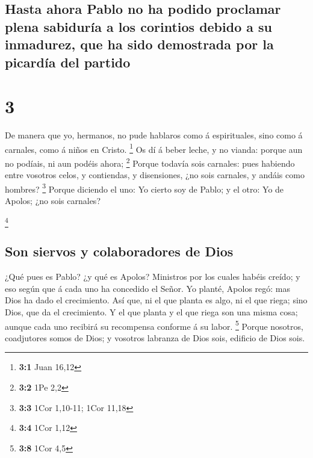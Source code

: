 \hypertarget{hasta-ahora-pablo-no-ha-podido-proclamar-plena-sabiduruxeda-a-los-corintios-debido-a-su-inmadurez-que-ha-sido-demostrada-por-la-picarduxeda-del-partido}{%
\subsection{Hasta ahora Pablo no ha podido proclamar plena sabiduría a
los corintios debido a su inmadurez, que ha sido demostrada por la
picardía del
partido}\label{hasta-ahora-pablo-no-ha-podido-proclamar-plena-sabiduruxeda-a-los-corintios-debido-a-su-inmadurez-que-ha-sido-demostrada-por-la-picarduxeda-del-partido}}

\hypertarget{section-2}{%
\section{3}\label{section-2}}

 De manera que yo, hermanos, no pude hablaros como á
espirituales, sino como á carnales, como á niños en Cristo. \footnote{\textbf{3:1}
  Juan 16,12}  Os dí á beber leche, y no vianda: porque aun
no podíais, ni aun podéis ahora; \footnote{\textbf{3:2} 1Pe 2,2}
 Porque todavía sois carnales: pues habiendo entre vosotros
celos, y contiendas, y disensiones, ¿no sois carnales, y andáis como
hombres? \footnote{\textbf{3:3} 1Cor 1,10-11; 1Cor 11,18} 
Porque diciendo el uno: Yo cierto soy de Pablo; y el otro: Yo de Apolos;
¿no sois carnales?

\footnote{\textbf{3:4} 1Cor 1,12}

\hypertarget{son-siervos-y-colaboradores-de-dios}{%
\subsection{Son siervos y colaboradores de
Dios}\label{son-siervos-y-colaboradores-de-dios}}

 ¿Qué pues es Pablo? ¿y qué es Apolos? Ministros por los
cuales habéis creído; y eso según que á cada uno ha concedido el Señor.
 Yo planté, Apolos regó: mas Dios ha dado el crecimiento.
 Así que, ni el que planta es algo, ni el que riega; sino
Dios, que da el crecimiento.  Y el que planta y el que riega
son una misma cosa; aunque cada uno recibirá su recompensa conforme á su
labor. \footnote{\textbf{3:8} 1Cor 4,5}  Porque nosotros,
coadjutores somos de Dios; y vosotros labranza de Dios sois, edificio de
Dios sois.

